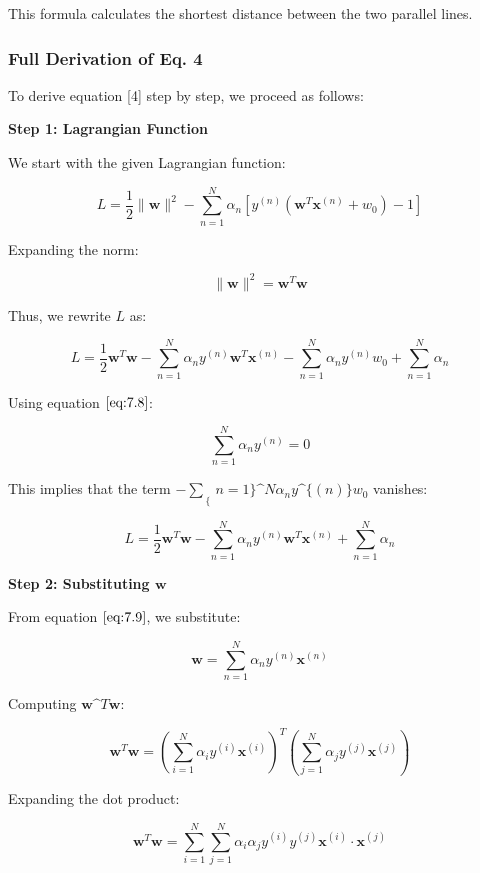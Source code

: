 \documentclass[11pt]{article}
\begin{document}
This formula calculates the shortest distance between the two parallel
lines.

    \subsubsection{Full Derivation of Eq. 4}\label{full-derivation-of-eq.-4}

To derive equation {[}4{]} step by step, we proceed as follows:

\textbf{Step 1: Lagrangian Function}

We start with the given Lagrangian function:

$$
L = \frac{1}{2} \|\mathbf{w}\|^2 - \sum\limits_{n=1}^N \alpha_n \left[ y^{(n)} \left( \mathbf{w}^T \mathbf{x}^{(n)} + w_0 \right) -1 \right]
$$

Expanding the norm:

$$
\|\mathbf{w}\|^2 = \mathbf{w}^T \mathbf{w}
$$

Thus, we rewrite $ L $ as:

$$
L = \frac{1}{2} \mathbf{w}^T \mathbf{w} - \sum\limits_{n=1}^N \alpha_n y^{(n)} \mathbf{w}^T \mathbf{x}^{(n)} - \sum\limits_{n=1}^N \alpha_n y^{(n)} w_0 + \sum\limits_{n=1}^N \alpha_n
$$

Using equation $ \eqref{eq:7.8} $:

$$
\sum\limits_{n=1}^N \alpha_n y^{(n)} = 0
$$

This implies that the term $ - \sum\limits_\{n=1\}\^{}N \alpha_n
y\^{}\{(n)\} w_0 $ vanishes:

$$
L = \frac{1}{2} \mathbf{w}^T \mathbf{w} - \sum\limits_{n=1}^N \alpha_n y^{(n)} \mathbf{w}^T \mathbf{x}^{(n)} + \sum\limits_{n=1}^N \alpha_n
$$

\textbf{Step 2: Substituting $ \mathbf{w} $}

From equation $ \eqref{eq:7.9} $, we substitute:

$$
\mathbf{w} = \sum\limits_{n=1}^N \alpha_n y^{(n)} \mathbf{x}^{(n)}
$$

Computing $ \mathbf{w}\^{}T \mathbf{w} $:

$$
\mathbf{w}^T \mathbf{w} = \left( \sum\limits_{i=1}^N \alpha_i y^{(i)} \mathbf{x}^{(i)} \right)^T \left( \sum\limits_{j=1}^N \alpha_j y^{(j)} \mathbf{x}^{(j)} \right)
$$

Expanding the dot product:

$$
\mathbf{w}^T \mathbf{w} = \sum\limits_{i=1}^N \sum\limits_{j=1}^N \alpha_i \alpha_j y^{(i)} y^{(j)} \mathbf{x}^{(i)} \cdot \mathbf{x}^{(j)}
$$
\end{document}
